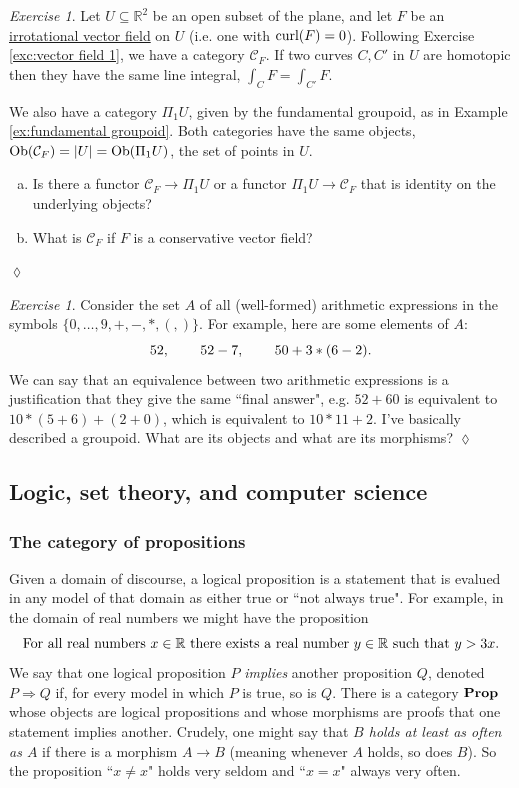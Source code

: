 \documentclass{book}
\def\tn{\textnormal}
\def\mc{\mathcal}
\def\RR{{\mathbb R}}
\def\Ob{\tn{Ob}}
\def\hsp{\hspace{.3in}}
\def\to{\rightarrow}
\def\ss{\subseteq}
\def\Prop{{\bf Prop}}
\def\mcC{\mc{C}}
\theoremstyle{remark}
\newtheorem{exc}[subsubsection]{Exercise}
\newenvironment{exercise}{\begin{exc}}{\hspace*{\fill}$\lozenge$\end{exc}}
\theoremstyle{definition}
\def\sexc{\begin{enumerate}[a.)]\setlength{\itemsep}{.1cm}\setlength{\parskip}{.1cm}\item}
\def\next{\item}
\def\endsexc{\end{enumerate}}
\begin{document}
\begin{exercise}
Let $U\ss\RR^2$ be an open subset of the plane, and let $F$ be an \href{http://en.wikipedia.org/wiki/Conservative_vector_field#Irrotational_vector_fields}{\text irrotational vector field} on $U$ (i.e. one with $\tn{curl}(F)=0$). Following Exercise \ref{exc:vector field 1}, we have a category $\mcC_F$. If two curves $C,C'$ in $U$ are homotopic then they have the same line integral, $\int_CF=\int_{C'}F$.

We also have a category $\Pi_1U$, given by the fundamental groupoid, as in Example \ref{ex:fundamental groupoid}. Both categories have the same objects, $\Ob(\mcC_F)=|U|=\Ob(\Pi_1U)$, the set of points in $U$.
\sexc Is there a functor $\mcC_F\to\Pi_1U$ or a functor $\Pi_1U\to\mcC_F$ that is identity on the underlying objects? 
\next What is $\mcC_F$ if $F$ is a conservative vector field?
\endsexc
\end{exercise}

\begin{exercise}
Consider the set $A$ of all (well-formed) arithmetic expressions in the symbols $\{0,\ldots,9,+,-,*,(,)\}$. For example, here are some elements of $A$: $$52,\hsp 52-7,\hsp 50+3*(6-2).$$ We can say that an equivalence between two arithmetic expressions is a justification that they give the same ``final answer", e.g. $52+60$ is equivalent to $10*(5+6)+(2+0)$, which is equivalent to $10*11+2$. I've basically described a groupoid. What are its objects and what are its morphisms?
\end{exercise}


\subsection{Logic, set theory, and computer science}


\subsubsection{The category of propositions}\label{sec:propositions}\index{a category!$\Prop$}

Given a domain of discourse, a logical proposition is a statement that is evalued in any model of that domain as either true or ``not always true". For example, in the domain of real numbers we might have the proposition 
$$\tn{For all real numbers }x\in\RR\tn{ there exists a real number } y\in\RR\tn{ such that }y>3x.$$
We say that one logical proposition $P$ {\em implies} another proposition $Q$, denoted $P\Rightarrow Q$ if, for every model in which $P$ is true, so is $Q$. There is a category $\Prop$ whose objects are logical propositions and whose morphisms are proofs that one statement implies another. Crudely, one might say that {\em $B$ holds at least as often as $A$} if there is a morphism $A\to B$ (meaning whenever $A$ holds, so does $B$). So the proposition ``$x\neq x$" holds very seldom and ``$x=x$" always very often.
\end{document}

